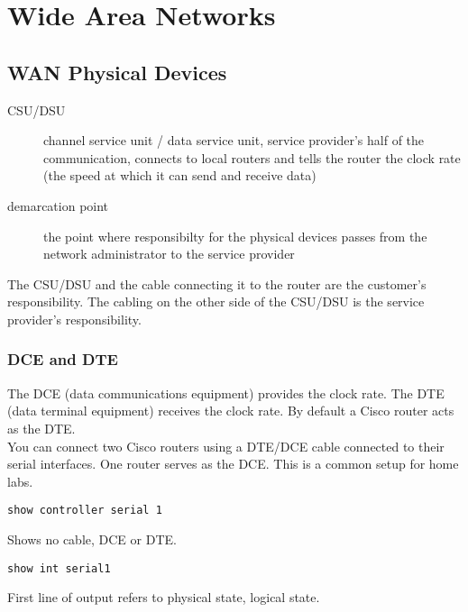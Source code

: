 \section{Wide Area Networks}

\subsection{WAN Physical Devices}

\begin{description}

\item[CSU/DSU]
channel service unit / data service unit, service provider's half of the
communication, connects to local routers and tells the router the clock rate
(the speed at which it can send and receive data)

\item[demarcation point]
the point where responsibilty for the physical devices passes from the
network administrator to the service provider
\end{description}

The CSU/DSU and the cable connecting it to the router are the customer's
responsibility. The cabling on the other side of the CSU/DSU is the service
provider's responsibility.

\subsubsection{DCE and DTE}

The DCE (data communications equipment) provides the clock rate. The DTE
(data terminal equipment) receives the clock rate. By default a Cisco
router acts as the DTE.\\

You can connect two Cisco routers using a DTE/DCE cable connected to their
serial interfaces. One router serves as the DCE. This is a common setup
for home labs.\\

\begin{verbatim}
show controller serial 1  
\end{verbatim}

Shows no cable, DCE or DTE.\\

\begin{verbatim}
show int serial1
\end{verbatim}

First line of output refers to physical state, logical state.

